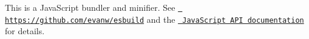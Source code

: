 This is a Java\+Script bundler and minifier. See \href{https://github.com/evanw/esbuild}{\texttt{ https\+://github.\+com/evanw/esbuild}} and the \href{https://esbuild.github.io/api/}{\texttt{ Java\+Script API documentation}} for details. 